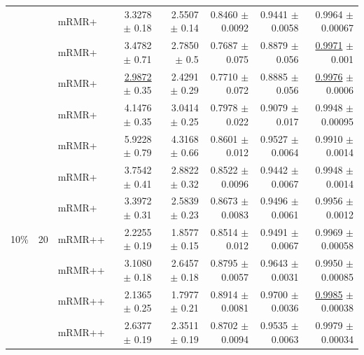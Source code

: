 \begin{longtable}{llp{}rrrrr}
 &  & mRMR+ & 3.3278 {\scriptsize $\pm$ 0.18} & 2.5507 {\scriptsize $\pm$ 0.14} & 0.8460 {\scriptsize $\pm$ 0.0092} & 0.9441 {\scriptsize $\pm$ 0.0058} & 0.9964 {\scriptsize $\pm$ 0.00067} \\
 &  & mRMR+ & 3.4782 {\scriptsize $\pm$ 0.71} & 2.7850 {\scriptsize $\pm$ 0.5} & 0.7687 {\scriptsize $\pm$ 0.075} & 0.8879 {\scriptsize $\pm$ 0.056} & \underline{0.9971} {\scriptsize $\pm$ 0.001} \\
 &  & mRMR+ & \underline{2.9872} {\scriptsize $\pm$ 0.35} & 2.4291 {\scriptsize $\pm$ 0.29} & 0.7710 {\scriptsize $\pm$ 0.072} & 0.8885 {\scriptsize $\pm$ 0.056} & \underline{0.9976} {\scriptsize $\pm$ 0.0006} \\
 &  & mRMR+ & 4.1476 {\scriptsize $\pm$ 0.35} & 3.0414 {\scriptsize $\pm$ 0.25} & 0.7978 {\scriptsize $\pm$ 0.022} & 0.9079 {\scriptsize $\pm$ 0.017} & 0.9948 {\scriptsize $\pm$ 0.00095} \\
 &  & mRMR+ & 5.9228 {\scriptsize $\pm$ 0.79} & 4.3168 {\scriptsize $\pm$ 0.66} & 0.8601 {\scriptsize $\pm$ 0.012} & 0.9527 {\scriptsize $\pm$ 0.0064} & 0.9910 {\scriptsize $\pm$ 0.0014} \\
 &  & mRMR+ & 3.7542 {\scriptsize $\pm$ 0.41} & 2.8822 {\scriptsize $\pm$ 0.32} & 0.8522 {\scriptsize $\pm$ 0.0096} & 0.9442 {\scriptsize $\pm$ 0.0067} & 0.9948 {\scriptsize $\pm$ 0.0014} \\
 &  & mRMR+ & 3.3972 {\scriptsize $\pm$ 0.31} & 2.5839 {\scriptsize $\pm$ 0.23} & 0.8673 {\scriptsize $\pm$ 0.0083} & 0.9496 {\scriptsize $\pm$ 0.0061} & 0.9956 {\scriptsize $\pm$ 0.0012} \\
\midrule
10\% & 20 & mRMR++ & 2.2255 {\scriptsize $\pm$ 0.19} & 1.8577 {\scriptsize $\pm$ 0.15} & 0.8514 {\scriptsize $\pm$ 0.012} & 0.9491 {\scriptsize $\pm$ 0.0067} & 0.9969 {\scriptsize $\pm$ 0.00058} \\
 &  & mRMR++ & 3.1080 {\scriptsize $\pm$ 0.18} & 2.6457 {\scriptsize $\pm$ 0.18} & 0.8795 {\scriptsize $\pm$ 0.0057} & 0.9643 {\scriptsize $\pm$ 0.0031} & 0.9950 {\scriptsize $\pm$ 0.00085} \\
 &  & mRMR++ & 2.1365 {\scriptsize $\pm$ 0.25} & 1.7977 {\scriptsize $\pm$ 0.21} & 0.8914 {\scriptsize $\pm$ 0.0081} & 0.9700 {\scriptsize $\pm$ 0.0036} & \underline{0.9985} {\scriptsize $\pm$ 0.00038} \\
 &  & mRMR++ & 2.6377 {\scriptsize $\pm$ 0.19} & 2.3511 {\scriptsize $\pm$ 0.19} & 0.8702 {\scriptsize $\pm$ 0.0094} & 0.9535 {\scriptsize $\pm$ 0.0063} & 0.9979 {\scriptsize $\pm$ 0.00034} \\

\end{longtable}
